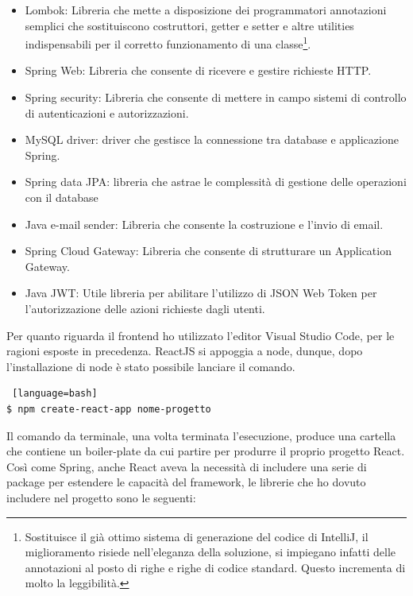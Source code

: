 \begin{itemize}
    \item Lombok: Libreria che mette a disposizione dei programmatori annotazioni semplici che sostituiscono costruttori, getter e setter e altre utilities indispensabili per il corretto funzionamento di una classe\footnote{
    Sostituisce il già ottimo sistema di generazione del codice di IntelliJ, il miglioramento risiede nell'eleganza della soluzione, si impiegano infatti delle annotazioni al posto di righe e righe di codice standard. Questo incrementa di molto la leggibilità.
    }.
    \item Spring Web: Libreria che consente di ricevere e gestire richieste HTTP.
    \item Spring security: Libreria che consente di mettere in campo sistemi di controllo di autenticazioni e autorizzazioni.
    \item MySQL driver: driver che gestisce la connessione tra database e applicazione Spring.
    \item Spring data JPA: libreria che astrae le complessità di gestione delle operazioni con il database
    \item Java e-mail sender: Libreria che consente la costruzione e l'invio di email.
    \item Spring Cloud Gateway: Libreria che consente di strutturare un Application Gateway.
    \item Java JWT: Utile libreria per abilitare l'utilizzo di JSON Web Token per l'autorizzazione delle azioni richieste dagli utenti.
\end{itemize}
Per quanto riguarda il frontend ho utilizzato l'editor Visual Studio Code, per le ragioni esposte in precedenza. ReactJS si appoggia a node, dunque, dopo l'installazione di node è stato possibile lanciare il comando.
\begin{lstlisting} [language=bash]
$ npm create-react-app nome-progetto
\end{lstlisting}
Il comando da terminale, una volta terminata l'esecuzione, produce una cartella che contiene un boiler-plate da cui partire per produrre il proprio progetto React.
\\
Così come Spring, anche React aveva la necessità di includere una serie di package per estendere le capacità del framework, le librerie che ho dovuto includere nel progetto sono le seguenti:
